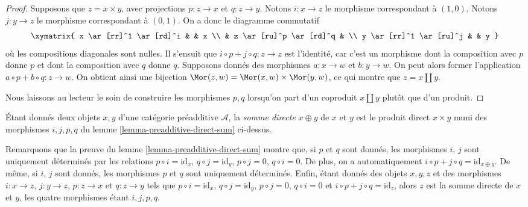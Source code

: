 \begin{proof}
Supposons que $z = x \times y$, avec projections
$p : z \to x$ et $q : z \to y$. Notons $i : x \to z$
le morphisme correspondant à $(1, 0)$. Notons $j : y \to z$
le morphisme correspondant à $(0, 1)$. On a donc le
diagramme commutatif
$$
\xymatrix{
x \ar[rr]^1 \ar[rd]^i & & x \\
& z \ar[ru]^p \ar[rd]^q & \\
y \ar[rr]^1 \ar[ru]^j & & y
}
$$
où les compositions diagonales sont nulles. Il s'ensuit que
$i \circ p + j \circ q : z \to z$ est l'identité, car
c'est un morphisme dont la composition avec $p$ donne $p$
et dont la composition avec $q$ donne $q$.
Supposons donnés des morphismes $a : x \to w$ et $b : y \to w$.
On peut alors former l'application $a \circ p + b \circ q : z \to w$.
On obtient ainsi une bijection $\Mor(z, w)
= \Mor(x, w) \times \Mor(y, w)$, ce qui
montre que $z = x \amalg y$.

\medskip\noindent
Nous laissons au lecteur le soin de construire les morphismes
$p, q$ lorsqu'on part d'un coproduit $x \amalg y$ plutôt que d'un
produit.
\end{proof}

\begin{definition}
\label{definition-direct-sum}
Étant donnés deux objets $x, y$ d'une catégorie préadditive $\mathcal{A}$,
la {\it somme directe} $x \oplus y$ de $x$ et $y$ est le
produit direct $x \times y$ muni des morphismes
$i, j, p, q$ du lemme \ref{lemma-preadditive-direct-sum} ci-dessus.
\end{definition}

\begin{remark}
\label{remark-direct-sum}
Remarquons que la preuve du lemme \ref{lemma-preadditive-direct-sum}
montre que, si $p$ et $q$ sont donnés, les morphismes $i$, $j$ sont uniquement
déterminés par les relations $p \circ i = \text{id}_x$,
$q \circ j = \text{id}_y$, $p \circ j = 0$, $q \circ i = 0$.
De plus, on a automatiquement
$i \circ p + j \circ q = \text{id}_{x \oplus y}$.
De même, si $i$, $j$ sont donnés, les morphismes $p$ et $q$ sont uniquement déterminés.
Enfin, étant donnés des objets $x, y, z$ et des morphismes
$i : x \to z$, $j : y \to z$, $p : z \to x$ et
$q : z \to y$ tels que $p \circ i = \text{id}_x$,
$q \circ j = \text{id}_y$, $p \circ j = 0$, $q \circ i = 0$
et $i \circ p + j \circ q = \text{id}_z$, alors $z$
est la somme directe de $x$ et $y$, les quatre morphismes
étant $i, j, p, q$.
\end{remark}

